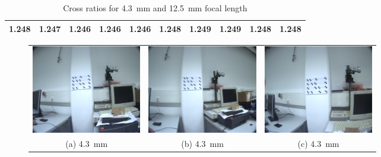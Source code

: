 \documentclass[
a4paper,     %
11pt         %
]{scrartcl}  %
\begin{document}
\begin{table}[ht!]
  \centering
  \begin{tabular}{|c|c|c|c|c||c|c|c|c|c|}\hline
    1.248 & 1.247 & 1.246 & 1.246 & 1.246 & 1.248 & 1.249 & 1.249 & 1.248 & 1.248\\\hline
  \end{tabular}
  \caption{Cross ratios for \SI{4.3}{mm} and \SI{12.5}{mm} focal length}
  \label{tab:cross_ratios}
\end{table}


\begin{figure}[ht!]
\centering
\begin{tabular}{ccc}
 \includegraphics[width=48mm]{./Bildg_Messtechnik_Lab/CrossRatio/images/image_a1.png} & \includegraphics[width=48mm]{./Bildg_Messtechnik_Lab/CrossRatio/images/image_a2.png} & \includegraphics[width=48mm]{./Bildg_Messtechnik_Lab/CrossRatio/images/image_a3.png}\\
(a) \SI{4.3}{mm} & (b) \SI{4.3}{mm} & (c) \SI{4.3}{mm}\\[6pt]

\end{tabular}
\end{figure}
\end{document}
